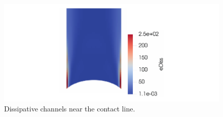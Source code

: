 \begin{figure}[h]
    \centering
    \includegraphics[width=.95\textwidth]{Pictures/eDiss_Wedge.pdf}
    \caption{Dissipative channels near the contact line.}
    \label{fig: eDiss_wedge}
\end{figure}

